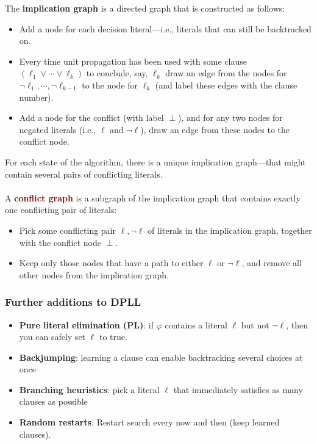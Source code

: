 The \textbf{\textcolor{NavyBlue}{implication graph}} is a directed graph that is constructed as follows:
\begin{itemize}
    \item Add a node for each decision literal—i.e., literals that can still be backtracked on.
    \item Every time unit propagation has been used with some clause $(\ell_1 \vee \cdots \vee \ell_k)$ to conclude, say, $\ell_k$ draw an edge from the nodes for $\neg \ell_1, \cdots, \neg \ell_{k-1}$ to the node for $\ell_k$ (and label these edges with the clause number).
    \item Add a node for the conflict (with label $\perp$), and for any two nodes for negated literals (i.e., $\ell$ and $\neg \ell$), draw an edge from these nodes to the conflict node.
\end{itemize}

For each state of the algorithm, there is a unique implication graph—that might contain several pairs of conflicting literals.
\\
\\
A \textbf{\textcolor{Maroon}{conflict graph}} is a subgraph of the \textcolor{NavyBlue}{implication graph} that contains exactly one conflicting pair of literals:
\begin{itemize}
    \item Pick some conflicting pair $\ell, \neg \ell$ of literals in the implication graph, together with the conflict node $\perp$.
    \item Keep only those nodes that have a path to either $\ell$ or $\neg \ell$, and remove all other nodes from the implication graph.
\end{itemize}

\subsubsection{Further additions to DPLL}
\begin{itemize}
    \item \textbf{Pure literal elimination (PL)}: if $\varphi$ contains a literal $\ell$ but not $\neg \ell$, then you can safely set $\ell$ to true.
    \item \textbf{Backjumping}: learning a clause can enable backtracking several choices at once
    \item \textbf{Branching heuristics}: pick a literal $\ell$ that immediately satisfies as many clauses as possible
    \item \textbf{Random restarts}: Restart search every now and then (keep learned clauses).
\end{itemize}

